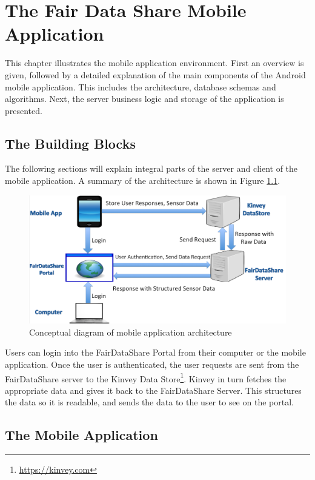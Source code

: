 \chapter{The Fair Data Share Mobile Application}
This chapter illustrates the mobile application environment. First an overview is given, followed by a detailed explanation of the main components of the Android mobile application. This includes the architecture, database schemas and algorithms. Next, the server business logic and storage of the application is presented.

\section{The Building Blocks}

The following sections will explain integral parts of the server and client of the mobile application. A summary of the architecture is shown
in Figure \ref{fig:bb}.

\begin{figure}[ht!]
\centering
\includegraphics[width=\textwidth,keepaspectratio]{./images/blocks_app}
\caption{Conceptual diagram of mobile application architecture}
\label{fig:bb}
\end{figure}

Users can login into the FairDataShare Portal from their computer or the mobile application. Once the user is authenticated, the user requests
are sent from the FairDataShare server to the Kinvey Data Store\footnote{\url{https://kinvey.com}}. Kinvey in turn fetches the appropriate data and gives it back to the FairDataShare Server. This structures the data so it is readable, and sends the data to the user to see on the portal.

\section{The Mobile Application}

